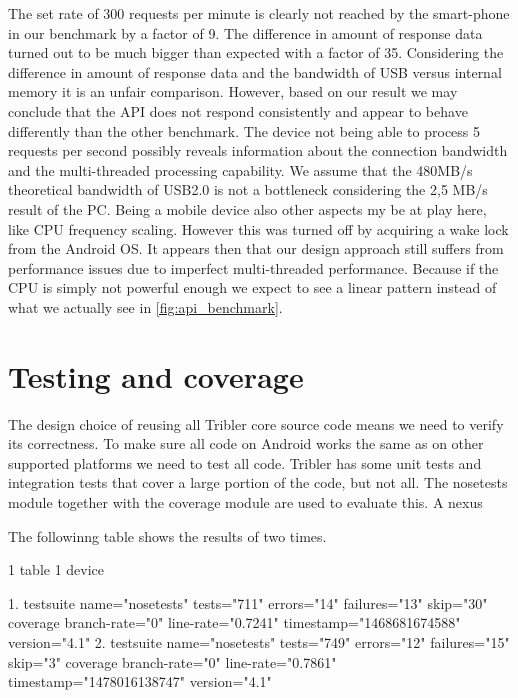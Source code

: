 The set rate of 300 requests per minute is clearly not reached by the smart-phone in our benchmark by a factor of 9.
The difference in amount of response data turned out to be much bigger than expected with a factor of 35.
Considering the difference in amount of response data and the bandwidth of USB versus internal memory it is an unfair comparison.
However, based on our result we may conclude that the API does not respond consistently and appear to behave differently than the other benchmark.
The device not being able to process 5 requests per second possibly reveals information about the connection bandwidth and the multi-threaded processing capability.
We assume that the 480MB/s theoretical bandwidth of USB2.0 is not a bottleneck considering the 2,5 MB/s result of the PC.
Being a mobile device also other aspects my be at play here, like CPU frequency scaling.
However this was turned off by acquiring a wake lock from the Android OS.
It appears then that our design approach still suffers from performance issues due to imperfect multi-threaded performance.
Because if the CPU is simply not powerful enough we expect to see a linear pattern instead of what we actually see in \ref{fig:api_benchmark}.


\section{Testing and coverage}
The design choice of reusing all Tribler core source code means we need to verify its correctness.
To make sure all code on Android works the same as on other supported platforms we need to test all code.
Tribler has some unit tests and integration tests that cover a large portion of the code, but not all.
The nosetests module together with the coverage module are used to evaluate this.
A nexus 

The followinng table shows the results of two times.

1 table
1 device

1.
testsuite name="nosetests" tests="711" errors="14" failures="13" skip="30"
coverage branch-rate="0" line-rate="0.7241" timestamp="1468681674588" version="4.1"
2.
testsuite name="nosetests" tests="749" errors="12" failures="15" skip="3"
coverage branch-rate="0" line-rate="0.7861" timestamp="1478016138747" version="4.1"








